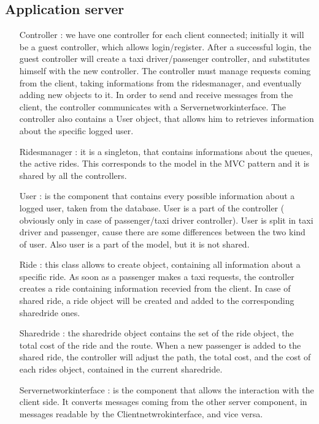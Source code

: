 	\subsection{Application server}
	\begin{itemize}
	 \item [Controller]: we have one controller for each client connected; initially it will be a guest controller,
	 which allows login/register. After a successful login, the guest controller will create a taxi driver/passenger controller,
	 and substitutes himself with the new controller. The controller must manage requests coming from
	 the client, taking informations from the ridesmanager, and eventually adding new objects to it.
	 In order to send and receive messages from the client, the controller communicates with a Servernetworkinterface.
	 The controller also contains a User object, that allows him to retrieves information about the specific logged user.
	 \item [Ridesmanager]: it is a singleton, that contains informations about the queues, the active rides. This corresponds 
	 to the model in the MVC pattern and it is shared by all the controllers.
	 \item [User]: is the component that contains every possible information about a logged user, taken from the database.
	 User is a part of the controller ( obviously only in case of passenger/taxi driver controller).
	 User is split in taxi driver and passenger, cause there are some differences between the two kind of user.
	 Also user is a part of the model, but it is not shared.
	 \item[Ride]: this class allows to create object, containing all information about a specific ride. 
	 As soon as a passenger makes a taxi requests, the controller creates a ride containing information recevied from the client.
	 In case of shared ride, a ride object will be created and added to the corresponding sharedride ones.
	 \item[Sharedride]: the sharedride object contains the set of the ride object, the total cost of the ride and the route.
	 When a new passenger is added to the shared ride, the controller will adjust the path, the total cost, and the cost of each
	 rides object, contained in the current sharedride.
	 \item[Servernetworkinterface]: is the component that allows the interaction with the client side. It converts messages coming from
	 the other server component, in messages readable by the Clientnetwrokinterface, and vice versa.
	\end{itemize}

